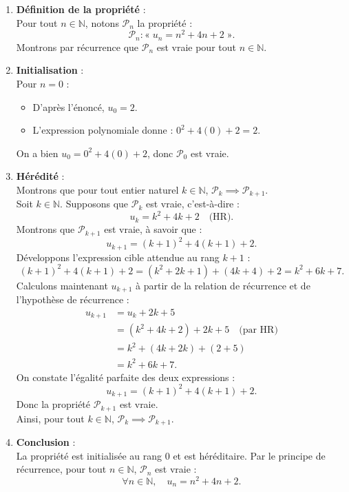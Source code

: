 \documentclass[11pt,a4paper]{article}
\newcommand{\N}{\mathbb{N}}
\begin{document}
\begin{correctionbox}
\begin{enumerate}[label=\textbf{\arabic*.}]
    \item \textbf{Définition de la propriété} :\\
    Pour tout $n \in \N$, notons $\mathcal{P}_n$ la propriété :
    \[
    \mathcal{P}_n : « \; u_n = n^2 + 4n + 2 \; ».
    \]
    Montrons par récurrence que $\mathcal{P}_n$ est vraie pour tout $n \in \N$.

    \item \textbf{Initialisation} :\\
    Pour $n = 0$ :
    \begin{itemize}
        \item D'après l'énoncé, $u_0 = 2$.
        \item L'expression polynomiale donne : $0^2 + 4(0) + 2 = 2$.
    \end{itemize}
    On a bien $u_0 = 0^2 + 4(0) + 2$, donc $\mathcal{P}_0$ est vraie.

    \item \textbf{Hérédité} :\\
    Montrons que pour tout entier naturel $k \in \N$, $\mathcal{P}_k \implies \mathcal{P}_{k+1}$.\\
    Soit $k \in \N$. Supposons que $\mathcal{P}_k$ est vraie, c'est-à-dire :
    \[
    u_k = k^2 + 4k + 2 \quad \text{(HR)}.
    \]
    Montrons que $\mathcal{P}_{k+1}$ est vraie, à savoir que :
    \[
    u_{k+1} = (k+1)^2 + 4(k+1) + 2.
    \]
    Développons l'expression cible attendue au rang $k+1$ :
    \[
    (k+1)^2 + 4(k+1) + 2 = (k^2 + 2k + 1) + (4k + 4) + 2 = k^2 + 6k + 7.
    \]
    Calculons maintenant $u_{k+1}$ à partir de la relation de récurrence et de l'hypothèse de récurrence :
    \begin{align*}
    u_{k+1} &= u_k + 2k + 5 \\
            &= (k^2 + 4k + 2) + 2k + 5 \quad \text{(par HR)} \\
            &= k^2 + (4k + 2k) + (2 + 5) \\
            &= k^2 + 6k + 7.
    \end{align*}
    On constate l'égalité parfaite des deux expressions :
    \[
    u_{k+1} = (k+1)^2 + 4(k+1) + 2.
    \]
    Donc la propriété $\mathcal{P}_{k+1}$ est vraie.\\
    Ainsi, pour tout $k \in \N$, $\mathcal{P}_k \implies \mathcal{P}_{k+1}$.

    \item \textbf{Conclusion} :\\
    La propriété est initialisée au rang $0$ et est héréditaire. Par le principe de récurrence, pour tout $n \in \N$, $\mathcal{P}_n$ est vraie :
    \[
    \forall n \in \N, \quad u_n = n^2 + 4n + 2.
    \]
\end{enumerate}
\end{correctionbox}
\end{document}
